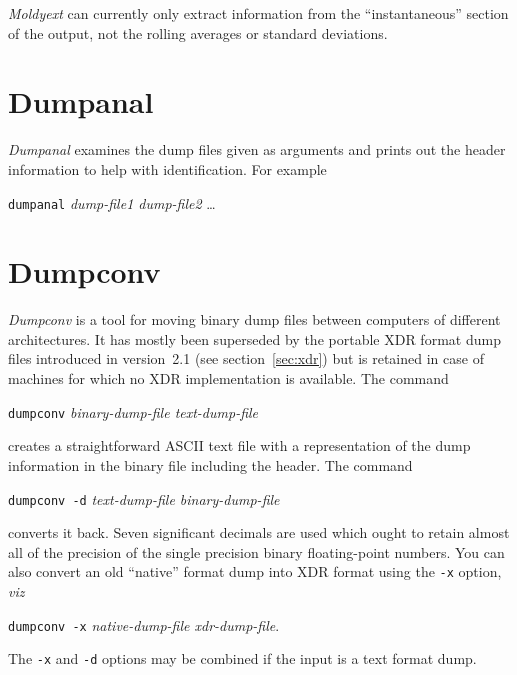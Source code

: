 {\em Moldyext\/} can currently only extract information from the
``instantaneous'' section of the output, not the rolling averages or
standard deviations.

\section{Dumpanal}%
{\em Dumpanal\/} examines the dump files given as arguments and
prints out the header information to help with identification. For
example
\begin{center}
\verb'dumpanal' {\em dump-file1 dump-file2} \ldots
\end{center}

\section{Dumpconv}%
\label{sec:dumpconv}
{\em Dumpconv\/} is a tool for moving binary dump files between
computers of different architectures.  It has mostly been superseded
by the portable XDR format dump files introduced in version~2.1 (see
section~\ref{sec:xdr}) but is retained in case of machines for which
no XDR implementation is available.  The command
\begin{center}
\verb'dumpconv' {\em binary-dump-file text-dump-file} 
\end{center}
creates a straightforward ASCII text file with a representation of the
dump information in the binary file including the header.  The command
\begin{center}
\verb'dumpconv -d' {\em text-dump-file binary-dump-file} 
\end{center}
converts it back.  Seven significant decimals are used which ought to
retain almost all of the precision of the single precision binary
floating-point numbers.  You can also convert an old ``native'' format
dump into XDR format using the \verb'-x' option, {\em viz\/}
\begin{center}
\verb'dumpconv -x' {\em native-dump-file xdr-dump-file}. 
\end{center}
The \verb'-x' and \verb'-d' options may be combined if the input is a
text format dump.
